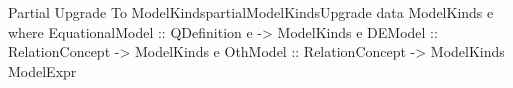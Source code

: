\begin{pseudohaskell}{Partial Upgrade To ModelKinds}{partialModelKindsUpgrade}
data ModelKinds e where
    EquationalModel :: QDefinition e -> ModelKinds e
    DEModel         :: RelationConcept -> ModelKinds e
    OthModel        :: RelationConcept -> ModelKinds ModelExpr
\end{pseudohaskell}
